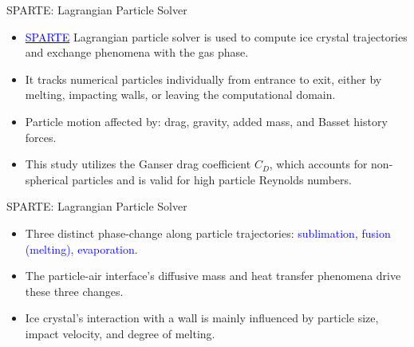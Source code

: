 \documentclass[aspectratio=169,xcolor=dvipsnames]{beamer}
\begin{document}



\begin{frame}{SPARTE: Lagrangian Particle Solver}
   \begin{itemize}
       \item \href{https://aerospacelab.onera.fr/sites/w3.onera.fr.aerospacelab/files/AL2-11_2.pdf}{\textcolor{blue}{SPARTE}} Lagrangian particle solver is used to compute ice crystal trajectories and exchange phenomena with the gas phase. 
       \item It tracks numerical particles individually from entrance to exit, either by melting, impacting walls, or leaving the computational domain.
       \item Particle motion affected by: drag, gravity, added mass, and Basset history forces. 
       \item This study utilizes the Ganser drag coefficient $C_{D}$, which accounts for non-spherical particles and is valid for high particle Reynolds numbers.
       
   \end{itemize}
\end{frame}

\begin{frame}{SPARTE: Lagrangian Particle Solver}
   \begin{itemize}
       \item Three distinct phase-change along particle trajectories: \textcolor{blue}{sublimation}, \textcolor{blue}{fusion (melting)}, \textcolor{blue}{evaporation}. 
       \item The particle-air interface's diffusive mass and heat transfer phenomena drive these three changes.
       \item Ice crystal's interaction with a wall is mainly influenced by particle size, impact velocity, and degree of melting. 
   \end{itemize}
\end{frame}
\end{document}
